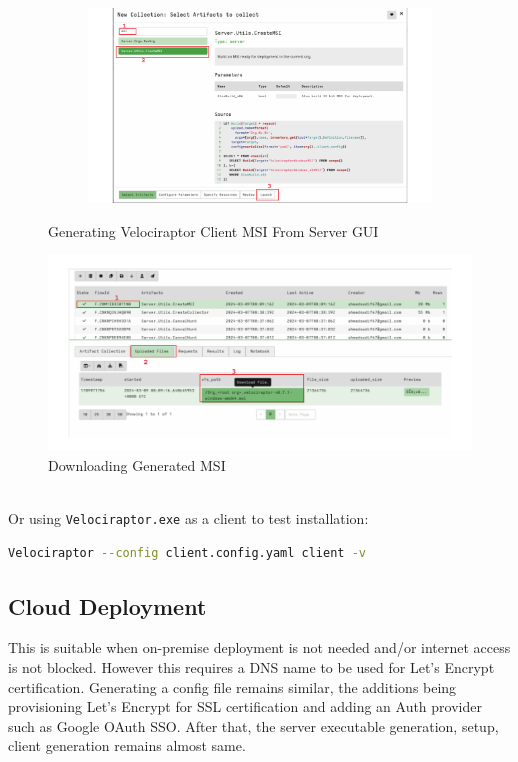 \documentclass[a4paper, 11pt, oneside]{article} %
\begin{document}
\begin{itemize}
\begin{figure}[ht]
\begin{subfigure}{0.45\linewidth}
        \label{fig:install1}
    \end{subfigure}
    \begin{subfigure}{0.45\linewidth}
        \includegraphics[width=\linewidth, center]{img/install/2.png}
        \label{fig:install2}
    \end{subfigure}

    \caption{Generating Velociraptor Client MSI From Server GUI}
    \label{fig:install}
    \end{figure}
    \begin{figure}[ht]
    \centering
    \includegraphics[width=\linewidth, center]{img/install/3.png}
    \caption{Downloading Generated MSI}
    \label{fig:install3}
    \end{figure}
    \\Or using \verb|Velociraptor.exe| as a client to test installation:
    \begin{lstlisting}[basicstyle=\ttfamily, breaklines=true, language=bash]
        Velociraptor --config client.config.yaml client -v
    \end{lstlisting}
    
\end{itemize}

\subsection{Cloud Deployment}
This is suitable when on-premise deployment is not needed and/or internet access is not blocked. However this requires a DNS name to be used for Let's Encrypt certification. Generating a config file remains similar, the additions being provisioning Let's Encrypt for SSL certification and adding an Auth provider such as Google OAuth SSO. After that, the server executable generation, setup, client generation remains almost same. 
\end{document}
